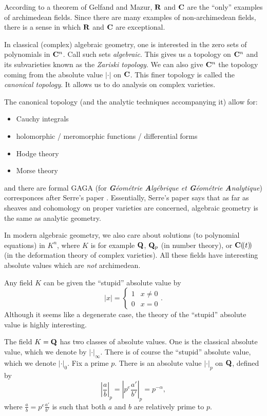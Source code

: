 According to a theorem of Gelfand and Mazur, $\mathbf{R}$ and $\mathbf{C}$ are the ``only'' 
examples of archimedean fields. Since there are many examples of 
non-archimedean fields, there is a sense in which $\mathbf{R}$ and $\mathbf{C}$ are 
exceptional. 

\begin{example}
In classical (complex) algebraic geometry, one is interested in the zero sets 
of polynomials in $\mathbf{C}^n$. Call such sets \emph{algebraic}. This gives us a 
topology on $\mathbf{C}^n$ and its subvarieties known as the \emph{Zariski topology}. 
We can also give $\mathbf{C}^n$ the topology coming from the absolute value $|\cdot|$ 
on $\mathbf{C}$. This finer topology is called the \emph{canonical topology}. It 
allows us to do analysis on complex varieties. 
\end{example}

The canonical topology (and the analytic techniques accompanying it) allow for: 
\begin{itemize}
  \item Cauchy integrals
  \item holomorphic / meromorphic functions / differential forms
  \item Hodge theory
  \item Morse theory
\end{itemize}
and there are formal GAGA (for \emph{\textbf{G}\'eom\'etrie \textbf{A}lg\'ebrique et \textbf{G}\'eom\'etrie 
\textbf{A}nalytique}) corresponces after Serre's paper \cite{serre-1956}. Essentially, Serre's 
paper says that as far as sheaves and cohomology on proper varieties are 
concerned, algebraic geometry is the same as analytic geometry. 

In modern algebraic geometry, we also care about solutions (to polynomial 
equations) in $K^n$, where $K$ is for example $\mathbf{Q}$, $\mathbf{Q}_p$ (in number 
theory), or $\mathbf{C}(\!( t)\!)$ (in the deformation theory of complex varieties). 
All these fields have interesting absolute values which are \emph{not} 
archimedean.

\begin{example}
Any field $K$ can be given the ``stupid'' absolute value by 
\[
  |x| = \begin{cases} 1 & x\ne 0 \\ 0 & x=0 \end{cases} .
\]
Although it seems like a degenerate case, the theory of the ``stupid'' 
absolute value is highly interesting. 
\end{example}

\begin{example}
The field $K=\mathbf{Q}$ has two classes of absolute values. One is the classical 
absolute value, which we denote by $|\cdot|_\infty$. There is of course the 
``stupid'' absolute value, which we denote $|\cdot|_0$. Fix a prime $p$. There 
is an absolute value $|\cdot|_p$ on $\mathbf{Q}$, defined by 
\[
  \left|\frac a b\right|_p = \left|p^e \frac{a'}{b'}\right|_p = p^{-\alpha} ,
\]
where $\frac a b=p^e \frac{a'}{b'}$ is such that both $a$ and $b$ are 
relatively prime to $p$. 
\end{example}

